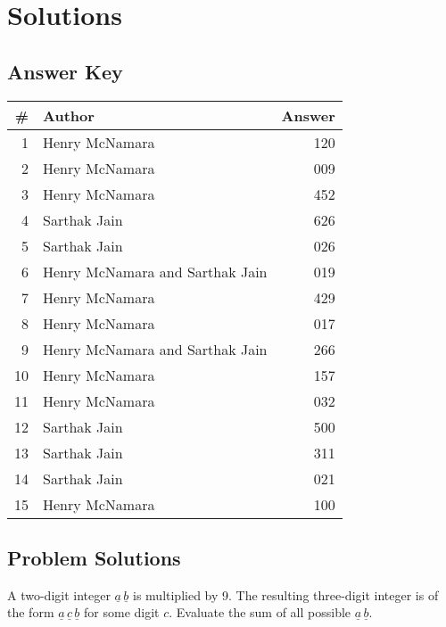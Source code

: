 \documentclass[11pt]{scrartcl}
\begin{document}
\pagebreak

\section{Solutions}

\subsection{Answer Key}

\begin{center}
    \begin{tabular}{r l | r}
        \# & Author & Answer \\
        \hline
        1 & Henry McNamara & 120 \\
        2 & Henry McNamara & 009 \\
        3 & Henry McNamara & 452 \\
        4 & Sarthak Jain & 626 \\
        5 & Sarthak Jain & 026 \\
        6 & Henry McNamara and Sarthak Jain & 019 \\
        7 & Henry McNamara & 429 \\
        8 & Henry McNamara & 017 \\
        9 & Henry McNamara and Sarthak Jain & 266 \\
        10 & Henry McNamara & 157 \\
        11 & Henry McNamara & 032 \\
        12 & Sarthak Jain & 500 \\
        13 & Sarthak Jain & 311 \\
        14 & Sarthak Jain & 021 \\
        15 & Henry McNamara & 100 \\
    \end{tabular}
\end{center}

\pagebreak

\subsection{Problem Solutions}

\begin{problem}
    A two-digit integer $\underline{a} \, \underline{b}$ is multiplied by 9. The resulting three-digit integer is of the form $\underline{a} \, \underline{c} \, \underline{b}$ for some digit $c$. Evaluate the sum of all possible $\underline{a} \, \underline{b}$.
\end{problem}
\end{document}
